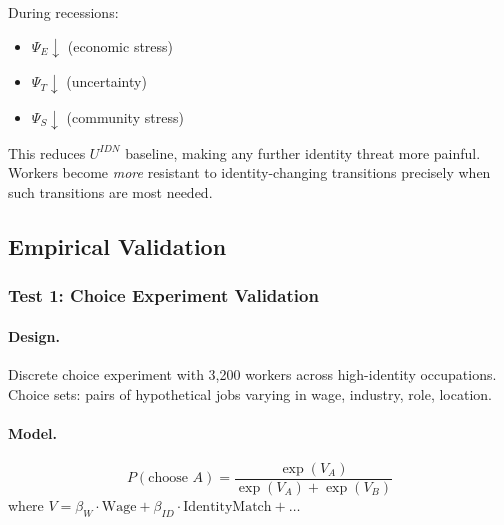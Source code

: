 During recessions:
\begin{itemize}
    \item $\Psi_E \downarrow$ (economic stress)
    \item $\Psi_T \downarrow$ (uncertainty)
    \item $\Psi_S \downarrow$ (community stress)
\end{itemize}

This reduces $U^{IDN}$ baseline, making any further identity threat 
more painful. Workers become \emph{more} resistant to identity-changing 
transitions precisely when such transitions are most needed.

\subsection{Empirical Validation}

\subsubsection{Test 1: Choice Experiment Validation}

\paragraph{Design.}
Discrete choice experiment with 3,200 workers across high-identity occupations.
Choice sets: pairs of hypothetical jobs varying in wage, industry, role, location.

\paragraph{Model.}
\begin{equation}
P(\text{choose } A) = \frac{\exp(V_A)}{\exp(V_A) + \exp(V_B)}
\end{equation}
where $V = \beta_W \cdot \text{Wage} + \beta_{ID} \cdot \text{IdentityMatch} + \ldots$

